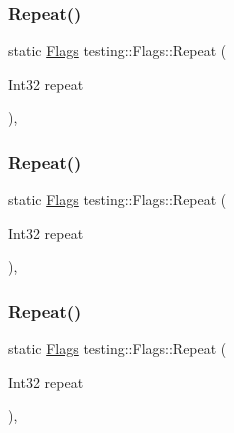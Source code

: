 \mbox{\label{structtesting_1_1_flags_a19d47e87d77a18ef4fa8a85b74e25956}} 
\subsubsection{\texorpdfstring{Repeat()}{Repeat()}\hspace{0.1cm}{\footnotesize\ttfamily [1/3]}}
{\footnotesize\ttfamily static \mbox{\hyperlink{structtesting_1_1_flags}{Flags}} testing\+::\+Flags\+::\+Repeat (\begin{DoxyParamCaption}\item[{Int32}]{repeat }\end{DoxyParamCaption})\hspace{0.3cm}{\ttfamily [inline]}, {\ttfamily [static]}}

\mbox{\label{structtesting_1_1_flags_a19d47e87d77a18ef4fa8a85b74e25956}} 
\subsubsection{\texorpdfstring{Repeat()}{Repeat()}\hspace{0.1cm}{\footnotesize\ttfamily [2/3]}}
{\footnotesize\ttfamily static \mbox{\hyperlink{structtesting_1_1_flags}{Flags}} testing\+::\+Flags\+::\+Repeat (\begin{DoxyParamCaption}\item[{Int32}]{repeat }\end{DoxyParamCaption})\hspace{0.3cm}{\ttfamily [inline]}, {\ttfamily [static]}}

\mbox{\label{structtesting_1_1_flags_a19d47e87d77a18ef4fa8a85b74e25956}} 
\subsubsection{\texorpdfstring{Repeat()}{Repeat()}\hspace{0.1cm}{\footnotesize\ttfamily [3/3]}}
{\footnotesize\ttfamily static \mbox{\hyperlink{structtesting_1_1_flags}{Flags}} testing\+::\+Flags\+::\+Repeat (\begin{DoxyParamCaption}\item[{Int32}]{repeat }\end{DoxyParamCaption})\hspace{0.3cm}{\ttfamily [inline]}, {\ttfamily [static]}}

